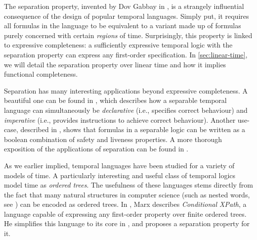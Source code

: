 \documentclass[a4paper,UKenglish,cleveref, autoref, thm-restate, numberwithinsect]{lipics-v2021}
\begin{document}
The separation property, invented by Dov Gabbay in \cite{Gabbay1981}, is a strangely influential consequence of the design of popular temporal languages. Simply put, it requires all formulas in the language to be equivalent to a variant made up of formulas purely concerned with certain \textit{regions} of time. Surprisingly, this property is linked to expressive completeness: a sufficiently expressive temporal logic with the separation property can express any first-order specification. In \cref{sec:linear-time}, we will detail the separation property over linear time and how it implies functional completeness.


Separation has many interesting applications beyond expressive completeness. A beautiful one can be found in \cite{DecPastImpFuture89}, which describes how a separable temporal language can simultaneously be \textit{declarative} (i.e., specifies correct behaviour) and \textit{imperative} (i.e., provides instructions to achieve correct behaviour). Another use-case, described in \cite{Lichtenstein1985TheGO}, shows that formulas in a separable logic can be written as a boolean combination of safety and liveness properties. A more thorough exposition of the applications of separation can be found in \cite{GabbayBirthday05}.

As we earlier implied, temporal languages have been studied for a variety of models of time. A particularly interesting and useful class of temporal logics model time as \textit{ordered trees}. The usefulness of these languages stems directly from the fact that many natural structures in computer science (such as nested words, see \cite{alur2009}) can be encoded as ordered trees. In \cite{marx2005conditional}, Marx describes \textit{Conditional XPath}, a language capable of expressing any first-order property over finite ordered trees. He simplifies this language to its core in \cite{xpathComplete}, and proposes a separation property for it.
\end{document}
